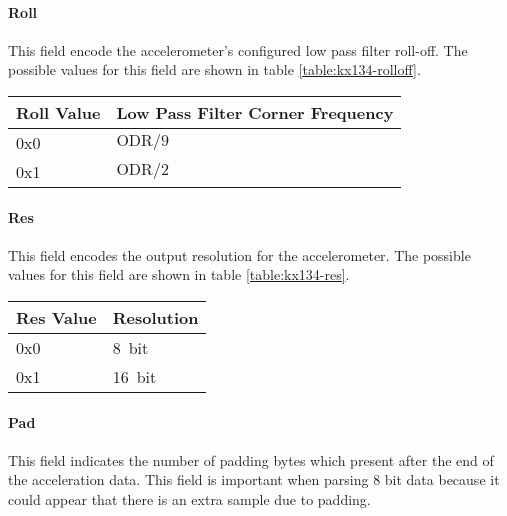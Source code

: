 \paragraph{Roll}
This field encode the accelerometer's configured low pass filter roll-off. The possible values for this field are shown
in table \ref{table:kx134-rolloff}.

\begin{table*}[htb]
    \centering
    \begin{tabular}{@{}ll@{}}
        \toprule
        Roll Value & Low Pass Filter Corner Frequency \\
        \midrule
        0x0        & $\text{ODR} / 9$                 \\
        0x1        & $\text{ODR} / 2$                 \\
        \bottomrule
    \end{tabular}
    \caption{KX134-1211 Low Pass Filter Rolloff Values}
    \label{table:kx134-rolloff}
\end{table*}

\paragraph{Res}
This field encodes the output resolution for the accelerometer. The possible values for this field are shown in table
\ref{table:kx134-res}.

\begin{table*}[htb]
    \centering
    \begin{tabular}{@{}ll@{}}
        \toprule
        Res Value & Resolution     \\
        \midrule
        0x0       & {\SI{8}{bit}}  \\
        0x1       & {\SI{16}{bit}} \\
        \bottomrule
    \end{tabular}
    \caption{KX134-1211 Resolution Values}
    \label{table:kx134-res}
\end{table*}

\paragraph{Pad}
This field indicates the number of padding bytes which present after the end of the acceleration data. This field is
important when parsing 8 bit data because it could appear that there is an extra sample due to padding.
